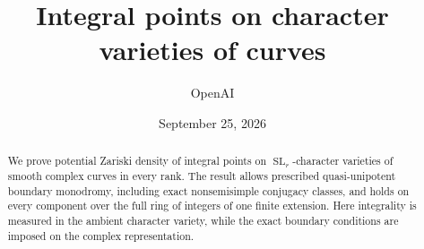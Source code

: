 \documentclass[11pt]{article}
\title{Integral points on character varieties of curves}
\author{OpenAI}
\date{September 25, 2026}
\theoremstyle{definition}
\DeclareMathOperator{\SL}{SL}
\begin{document}
\maketitle
\begin{abstract}
We prove potential Zariski density of integral points on $\SL_r$-character
varieties of smooth complex curves in every rank. The result allows
prescribed quasi-unipotent boundary monodromy, including exact nonsemisimple
conjugacy classes, and holds on every component over the full ring of
integers of one finite extension. Here integrality is measured in the
ambient character variety, while the exact boundary conditions are imposed
on the complex representation.
\end{abstract}
\tableofcontents










\end{document}
